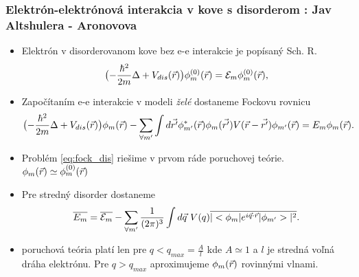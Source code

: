 \documentclass[
	11pt, %
]{beamer}
\begin{document}
\begin{frame}
\frametitle{Elektrón-elektrónová interakcia v kove s disorderom : Jav Altshulera - Aronovova}
\begin{itemize}
\item Elektrón v disorderovanom kove bez e-e interakcie je popísaný Sch. R.
\begin{equation}
\label{eq:schr_dis}
\bigl(-\frac{\hbar^2}{2m}\Delta + V_{dis}(\vec{r})\bigr)\phi_m^{(0)}(\vec{r})=\mathcal{E}_m\phi_m^{(0)}(\vec{r}) \text{,}
\end{equation}
\item Započítaním e-e interakcie v modeli \emph{želé} dostaneme Fockovu rovnicu
\small
\begin{equation}
 \label{eq:fock_dis}
 \bigl(-\frac{\hbar^2}{2m}\Delta + V_{dis}(\vec{r}) \bigr)\phi_m(\vec{r})-\sum_{\forall m'} \int d\vec{r'} \phi^*_{m'}(\vec{r})\phi_{m}(\vec{r'})V(\vec{r}-\vec{r'})\phi_{m'}(\vec{r})=E_m\phi_m(\vec{r}) \text{.}
\end{equation}
\normalsize
\item Problém \eqref{eq:fock_dis} riešime v prvom ráde poruchovej teórie. $\phi_m(\vec{r}) \simeq \phi_m^{(0)}(\vec{r})$
\item Pre stredný disorder dostaneme 
\small
\begin{equation}
\label{eq:erg_meandis}
 \overline{E_m}=\overline{\mathcal{E}_m}-\sum_{\forall m'} \frac{1}{(2\pi)^{3}} \int d\vec{q}\ V(q) \overline{|<\phi_m|e^{i\vec{q}\cdot\vec{r}}|\phi_{m'}>|^2} \text{.}
\end{equation}
\normalsize
\item poruchová teória platí len pre $q<q_{max}=\frac{A}{l}$ kde $A\simeq 1$ a $l$ je stredná voľná dráha elektrónu. Pre $q>q_{max}$ aproximujeme $\phi_m(\vec{r})$ rovinnými vlnami.
\end{itemize}
\end{frame}
\end{document}
